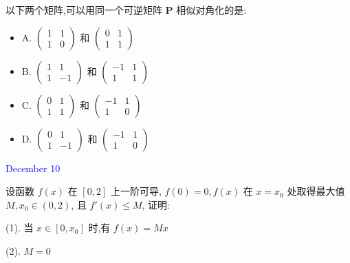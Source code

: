 \begin{solution}
	
\end{solution}

\begin{example}[][Exam: 38.2.4]
	以下两个矩阵,可以用同一个可逆矩阵 $\mathbf{P}$ 相似对角化的是:
\begin{itemize}
	\item A.\quad 
	$\begin{pmatrix}
		1 & 1\\
		1 & 0
	\end{pmatrix}$ 和
	$\begin{pmatrix}
		0 & 1\\
		1 & 1
	\end{pmatrix}$
	\item B.\quad 
	$\begin{pmatrix}
		1 & 1\\
		1 &-1
	\end{pmatrix}$ 和
	$\begin{pmatrix}
	   -1 & 1\\
		1 & 1
	\end{pmatrix}$
	\item C.\quad
	 $\begin{pmatrix}
		0 & 1\\
		1 & 1
	\end{pmatrix}$ 和
	$\begin{pmatrix}
	   -1 & 1\\
		1 & 0
	\end{pmatrix}$
	\item D.\quad 
	$\begin{pmatrix}
		0 & 1\\
		1 &-1
	\end{pmatrix}$ 和
	$\begin{pmatrix}
	   -1 & 1\\
		1 & 0
	\end{pmatrix}$
\end{itemize}
\end{example}

\begin{solution}
	
\end{solution}


\textcolor{blue}{December 10}

\begin{example}[][Exam: 38.2.5]
	设函数 $f(x)$ 在 $[0,2]$ 上一阶可导, $f(0)=0,f(x)$ 在 $x=x_{0}$ 处取得最大值 $M, x_{0}\in(0,2)$, 且 $f'(x)\leq M$, 证明:

(1). 当 $x\in[0,x_{0}]$ 时,有 $f(x)=Mx$

(2). $M=0$
\end{example}

